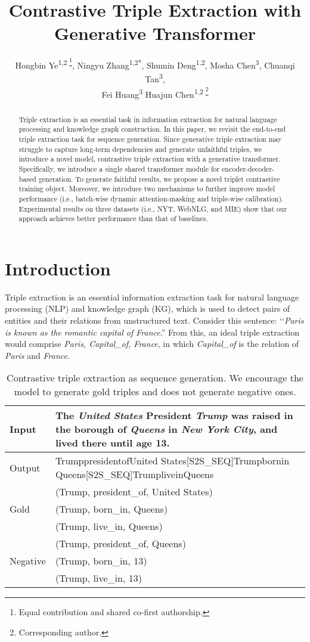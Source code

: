 \documentclass[letterpaper]{article} \usepackage{aaai21}  \usepackage{times}  \usepackage{helvet} \usepackage{courier}  \usepackage[hyphens]{url}  \usepackage{graphicx} \urlstyle{rm} \def\UrlFont{\rm}  \usepackage{natbib}  \usepackage[noend]{algpseudocode}
\title{Contrastive Triple Extraction with Generative Transformer}
\author {
Hongbin Ye\textsuperscript{\rm 1,2 \footnote{Equal contribution and shared co-first authorship.}},
        Ningyu Zhang\textsuperscript{\rm 1,2*\dag},
        Shumin Deng\textsuperscript{\rm 1,2},
        Mosha Chen\textsuperscript{\rm 3},
        Chuanqi Tan\textsuperscript{\rm 3}, \\
        Fei Huang\textsuperscript{\rm 3}
        Huajun Chen\textsuperscript{\rm 1,2 \footnote{Corresponding author.}}
        \\
}
\begin{document}
\maketitle

\begin{abstract}
Triple extraction is an essential task in information extraction for natural language processing and knowledge graph construction. In this paper, we revisit the end-to-end triple extraction task for sequence generation. Since generative triple extraction may struggle to capture long-term dependencies and generate unfaithful triples, we introduce a novel model, contrastive triple extraction with a generative transformer. Specifically, we introduce a single shared transformer module for encoder-decoder-based generation. To generate faithful results, we propose a novel triplet contrastive training object.  Moreover, we introduce two mechanisms to further improve model performance (i.e., batch-wise dynamic attention-masking and triple-wise calibration).  Experimental results on three datasets (i.e., NYT, WebNLG, and MIE) show that our approach achieves better performance than that of baselines. \end{abstract}
\section{Introduction}
Triple extraction is an essential information extraction task for natural language processing (NLP) and knowledge graph (KG), which is used to detect pairs of entities and their relations from unstructured text. Consider this sentence: ‘‘\emph{Paris is known as the romantic capital of France}.'' From this, an ideal triple extraction would comprise {\it Paris, Capital\_of, France}, in which {\it Capital\_of} is the relation of {\it Paris} and {\it France}.

\begin{table}[h] \centering
\begin{tabular}{l|p{6.5cm}}
 \toprule
    Input&  The \emph{United States} President \emph{Trump} was raised in the borough of \emph{Queens} in \emph{New York City}, and lived there until age 13.  \\
    \midrule
    Output& TrumppresidentofUnited States[S2S\_SEQ]Trumpbornin Queens[S2S\_SEQ]TrumpliveinQueens \\
    \midrule
    \multirow{3}{*}{Gold}& (Trump, president\_of, United States)\\ &(Trump, born\_in, Queens) \\ &(Trump, live\_in, Queens) \\
    \midrule
    \multirow{3}{*}{Negative}& (Trump, president\_of, Queens)\\ &(Trump, born\_in, 13) \\ &(Trump, live\_in, 13) \\
 \bottomrule
\end{tabular}
\caption{Contrastive triple extraction  as sequence generation. We encourage the model to generate gold triples and does not generate negative ones.}
\label{nyt}
\end{table}
\end{document}
